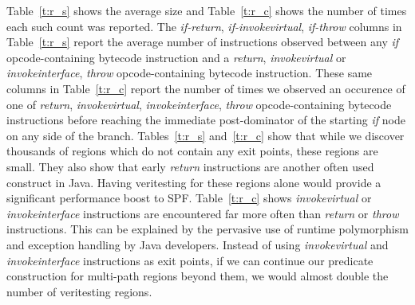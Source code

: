 %
Table~\ref{t:r_s} shows the average size and Table~\ref{t:r_c} shows the number of times each such count was reported.
%
The \textit{if-return}, \textit{if-invokevirtual}, \textit{if-throw} columns in Table~\ref{t:r_s} report the average number of instructions observed between any \textit{if} opcode-containing bytecode instruction and a \textit{return}, \textit{invokevirtual} or \textit{invokeinterface}, \textit{throw} opcode-containing bytecode instruction.
%
These same columns in Table~\ref{t:r_c} report the number of times we observed an occurence of one of \textit{return}, \textit{invokevirtual}, \textit{invokeinterface}, \textit{throw} opcode-containing bytecode instructions before reaching the immediate post-dominator of the starting \textit{if} node on any side of the branch.
%
Tables~\ref{t:r_s} and~\ref{t:r_c} show that while we discover thousands of regions which do not contain any exit points, these regions are small.
%
They also show that early \textit{return} instructions are another often used construct in Java.
%
Having veritesting for these regions alone would provide a significant performance boost to SPF.
%
Table~\ref{t:r_c} shows \textit{invokevirtual} or \textit{invokeinterface} instructions are encountered far more often than \textit{return} or \textit{throw} instructions.
%
This can be explained by the pervasive use of runtime polymorphism and exception handling by Java developers.
%
Instead of using \textit{invokevirtual} and \textit{invokeinterface}
instructions as exit points, if we can continue our predicate
construction for multi-path regions beyond them, we would almost double
the number of veritesting regions.
%

%
%
